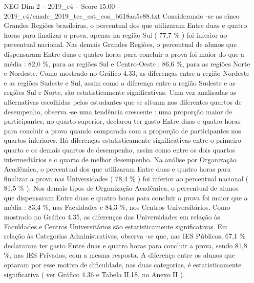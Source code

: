 \begin{textsample}{NEG Dim 2 – 2019\_c4 – Score 15.00 – 2019\_c4/enade\_2019\_tec\_est\_cos\_b618aa5e88.txt}
Considerando -se as cinco Grandes Regiões brasileiras, o percentual dos que utilizaram Entre duas e quatro horas para finalizar a prova, apenas na região Sul ( 77,7 \% ) foi inferior ao percentual nacional.
Nas demais Grandes Regiões, o percentual de alunos que dispensaram Entre duas e quatro horas para concluir a prova foi maior do que a média : 82,0 \%, para as regiões Sul e Centro-Oeste ; 86,6 \%, para as regiões Norte e Nordeste.
Como mostrado no Gráfico 4.33, as diferenças entre a região Nordeste e as regiões Sudeste e Sul, assim como a diferença entre a região Sudeste e as regiões Sul e Norte, são estatisticamente significativas.
Uma vez analisadas as alternativas escolhidas pelos estudantes que se situam nos diferentes quartos de desempenho, observa -se uma tendência crescente : uma proporção maior de participantes, no quarto superior, declarou ter gasto Entre duas e quatro horas para concluir a prova quando comparada com a proporção de participantes nos quartos inferiores.
Há diferenças estatisticamente significativas entre o primeiro quarto e os demais quartos de desempenho, assim como entre os dois quartos intermediários e o quarto de melhor desempenho.
Na análise por Organização Acadêmica, o percentual dos que utilizaram Entre duas e quatro horas para finalizar a prova nas Universidades ( 78,4 \% ) foi inferior ao percentual nacional ( 81,5 \% ).
Nos demais tipos de Organização Acadêmica, o percentual de alunos que dispensaram Entre duas e quatro horas para concluir a prova foi maior que a média : 83,4 \%, nas Faculdades e 84,3 \%, nos Centros Universitários.
Como mostrado no Gráfico 4.35, as diferenças das Universidades em relação às Faculdades e Centros Universitários são estatisticamente significativas.
Em relação às Categorias Administrativas, observa -se que, nas IES Públicas, 67,1 \% declararam ter gasto Entre duas e quatro horas para concluir a prova, sendo 81,8 \%, nas IES Privadas, com a mesma resposta.
A diferença entre os alunos que optaram por esse motivo de dificuldade, nas duas categorias, é estatisticamente significativa ( ver Gráfico 4.36 e Tabela II.18, no Anexo II ).

\end{textsample}
